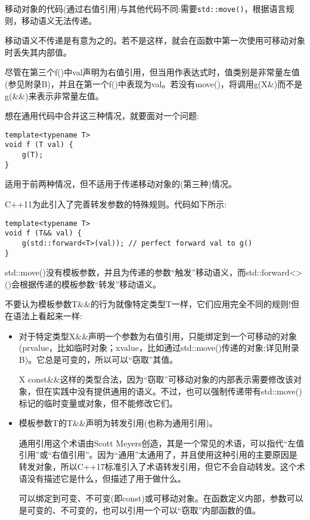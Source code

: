 移动对象的代码(通过右值引用)与其他代码不同:需要\texttt{std::move()}，根据语言规则，移动语义无法传递。

\begin{tcolorbox}[colback=webgreen!5!white,colframe=webgreen!75!black]
\hspace*{0.75cm}移动语义不传递是有意为之的。若不是这样，就会在函数中第一次使用可移动对象时丢失其内部值。
\end{tcolorbox}

尽管在第三个f()中val声明为右值引用，但当用作表达式时，值类别是非常量左值(参见附录B)，并且在第一个f()中表现为val。若没有move()，将调用g(X\&)而不是g(\&\&)来表示非常量左值。

想在通用代码中合并这三种情况，就要面对一个问题:

\begin{lstlisting}[style=styleCXX]
template<typename T>
void f (T val) {
	g(T);
}
\end{lstlisting}

适用于前两种情况，但不适用于传递移动对象的(第三种)情况。

C++11为此引入了完善转发参数的特殊规则。代码如下所示:

\begin{lstlisting}[style=styleCXX]
template<typename T>
void f (T&& val) {
	g(std::forward<T>(val)); // perfect forward val to g()
}
\end{lstlisting}

std::move()没有模板参数，并且为传递的参数“触发”移动语义，而std::forward<>()会根据传递的模板参数“转发”移动语义。

不要认为模板参数T\&\&的行为就像特定类型T一样，它们应用完全不同的规则!但在语法上看起来一样:

\begin{itemize}
\item 
对于特定类型X\&\&声明一个参数为右值引用，只能绑定到一个可移动的对象(prvalue，比如临时对象；xvalue，比如通过std::move()传递的对象;详见附录B)。它总是可变的，所以可以“窃取”其值。

\begin{tcolorbox}[colback=webgreen!5!white,colframe=webgreen!75!black]
\hspace*{0.75cm}X const\&\&这样的类型合法，因为“窃取”可移动对象的内部表示需要修改该对象，但在实践中没有提供通用的语义。不过，也可以强制传递带有std::move()标记的临时变量或对象，但不能修改它们。
\end{tcolorbox}

\item 
模板参数T的T\&\&声明为转发引用(也称为通用引用)。

\begin{tcolorbox}[colback=webgreen!5!white,colframe=webgreen!75!black]
\hspace*{0.75cm}通用引用这个术语由Scott Meyers创造，其是一个常见的术语，可以指代“左值引用”或“右值引用”。因为“通用”太通用了，并且使用这种引用的主要原因是转发对象，所以C++17标准引入了术语转发引用，但它不会自动转发。这个术语没有描述它是什么，但描述了用于做什么。
\end{tcolorbox}

可以绑定到可变、不可变(即const)或可移动对象。在函数定义内部，参数可以是可变的、不可变的，也可以引用一个可以“窃取”内部函数的值。
\end{itemize}

